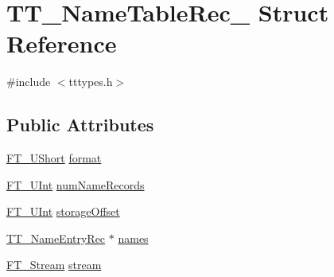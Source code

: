 \hypertarget{struct_t_t___name_table_rec__}{\section{T\-T\-\_\-\-Name\-Table\-Rec\-\_\- Struct Reference}
\label{struct_t_t___name_table_rec__}
}


{\ttfamily \#include $<$tttypes.\-h$>$}

\subsection*{Public Attributes}
\begin{DoxyCompactItemize}
\item 
\hyperlink{fttypes_8h_a937f6c17cf5ffd09086d8610c37b9f58}{F\-T\-\_\-\-U\-Short} \hyperlink{struct_t_t___name_table_rec___a762c5431cbe285cb7153bb5650710fb0}{format}
\item 
\hyperlink{fttypes_8h_abcb8db4dbf35d2b55a9e8c7b0926dc52}{F\-T\-\_\-\-U\-Int} \hyperlink{struct_t_t___name_table_rec___a5b565d940b9d02bb69cd19da5cda61b8}{num\-Name\-Records}
\item 
\hyperlink{fttypes_8h_abcb8db4dbf35d2b55a9e8c7b0926dc52}{F\-T\-\_\-\-U\-Int} \hyperlink{struct_t_t___name_table_rec___a4ed1f4e78e39b2e206411e9ea4d23801}{storage\-Offset}
\item 
\hyperlink{tttypes_8h_a3cf0b982abdf6798e5bdcb72ab74cd70}{T\-T\-\_\-\-Name\-Entry\-Rec} $\ast$ \hyperlink{struct_t_t___name_table_rec___a693aed17954386eb8fb5fd7f69d5b551}{names}
\item 
\hyperlink{ftsystem_8h_a788b32c932932f7411a8dfa7f6c794bf}{F\-T\-\_\-\-Stream} \hyperlink{struct_t_t___name_table_rec___a97109aec8cd7ca13f6627f3fee15d48d}{stream}
\end{DoxyCompactItemize}


